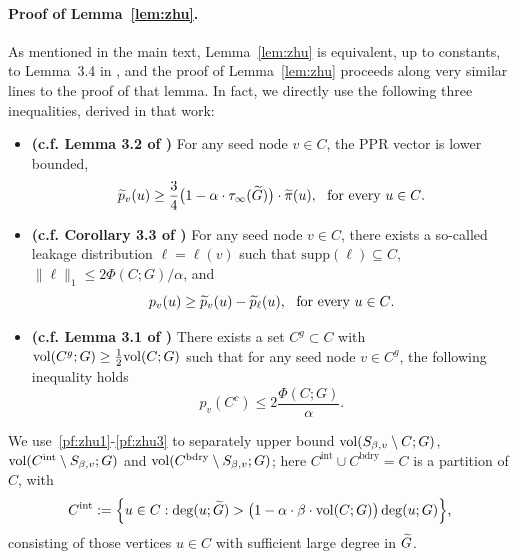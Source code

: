 \paragraph{Proof of Lemma~\ref{lem:zhu}.}
As mentioned in the main text, Lemma~\ref{lem:zhu} is equivalent, up to constants, to Lemma~3.4 in \cite{zhu2013}, and the proof of Lemma~\ref{lem:zhu} proceeds along very similar lines to the proof of that lemma. In fact, we directly use the following three inequalities, derived in that work:
\begin{itemize}
	\item \textbf{(c.f. Lemma 3.2 of \cite{zhu2013})} For any seed node $v \in C$, the PPR vector is lower bounded,
	\begin{equation}
	\label{pf:zhu1}
	\widetilde{p}_v(u) \geq \frac{3}{4}\bigl(1 - \alpha \cdot \tau_{\infty}(\widetilde{G})\bigr) \cdot \widetilde{\pi}(u),~~\textrm{for every $u \in C$.}
	\end{equation}
	\item \textbf{(c.f. Corollary 3.3 of \cite{zhu2013})} For any seed node $v \in C$, there exists a so-called leakage distribution $\ell = \ell(v)$ such that $\mathrm{supp}(\ell) \subseteq C$, $\|\ell\|_1 \leq 2\Phi(C;G)/\alpha$, and 
	\begin{equation}
	\label{pf:zhu2}
	p_v(u) \geq \widetilde{p}_v(u) - \widetilde{p}_{\ell}(u),~~\textrm{for every $u \in C$.}
	\end{equation}
	\item \textbf{(c.f. Lemma 3.1 of \cite{zhu2013})} There exists a set $C^g \subset C$ with $\mathrm{vol}(C^g;G) \geq \frac{1}{2}\mathrm{vol}(C;G)$ such that for any seed node $v \in C^g$, the following inequality holds
	\begin{equation}
	\label{pf:zhu3}
	p_v(C^c) \leq 2\frac{\Phi(C;G)}{\alpha}.
	\end{equation}
\end{itemize}
We use~\eqref{pf:zhu1}-\eqref{pf:zhu3} to separately upper bound $\mathrm{vol}(S_{\beta,v} \setminus C;G)$, $\mathrm{vol}(C^{\mathrm{int}} \setminus S_{\beta,v};G)$ and $\mathrm{vol}(C^{\mathrm{bdry}} \setminus S_{\beta,v};G)$; here $C^{\mathrm{int}} \cup C^{\mathrm{bdry}} = C$ is a partition of $C$, with
\begin{equation*}
C^{\mathrm{int}} := \Bigl\{u \in C: \deg(u;\widetilde{G}) > \bigl(1 - \alpha \cdot \beta \cdot \mathrm{vol}(C;G)\bigr) \deg(u;G) \Bigr\},
\end{equation*}
consisting of those vertices $u \in C$ with sufficient large degree in $\widetilde{G}$. 

